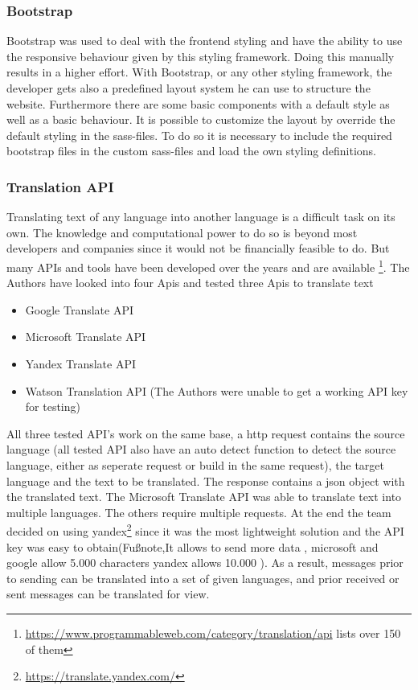 \subsubsection{Bootstrap}
Bootstrap was used to deal with the frontend styling and have the ability to use the responsive behaviour given by this styling framework. Doing this manually results in a higher effort. With Bootstrap, or any other styling framework, the developer gets also a predefined layout  system he can use to structure the website. Furthermore there are some basic components with a default style as well as a basic behaviour. It is possible to customize the layout by override the default styling in the sass-files. To do so it is necessary to include the required bootstrap files in the custom sass-files and load the own styling definitions.

\setcounter{footnote}{0}
\subsubsection{Translation API}
Translating text of any language into another language is a difficult task on its own. The knowledge and computational power to do so is beyond most developers and companies since it would not be financially feasible to do. But many APIs and tools have been developed over the years and are available \footnote{\url{https://www.programmableweb.com/category/translation/api} lists over 150 of them}. The Authors have looked into four Apis and tested three Apis to translate text
\begin{itemize}
	\item Google Translate API 
	\item Microsoft Translate API
	\item Yandex Translate API
	\item Watson Translation API (The Authors were unable to get a working API key for testing)
\end{itemize}

All three tested API’s work on the same base, a http request contains the source language (all tested API also have an auto detect function to detect the source language, either as seperate request or build in the same request), the target language and the text to be translated. The response contains a json object with the translated text. The Microsoft Translate API was able to translate text into multiple languages. The others require multiple requests. At the end the team decided on using yandex\footnote{\url{https://translate.yandex.com/}} since it was the most lightweight solution and the API key was easy to obtain(Fußnote,It allows to send more data , microsoft and google allow 5.000 characters yandex allows 10.000 ).
As a result, messages prior to sending can be translated into a set of given languages, and prior received or sent messages can be translated for view.
